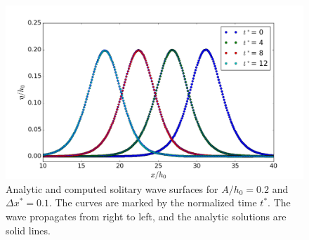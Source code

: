 \documentclass[review]{elsarticle}
\begin{document}
\begin{figure}[!htb]
\centering
\includegraphics[width=.8\textwidth]{_fig/soliton_ts.png}
\caption{Analytic and computed solitary wave surfaces for 
$A/h_0=0.2$ and $\Delta x^*=0.1$. 
The curves are marked by the normalized time
$t^*$. 
The wave propagates from right to left,
and the analytic solutions are solid lines.}
\label{fig:soliton_ts}
\end{figure}
\end{document}
